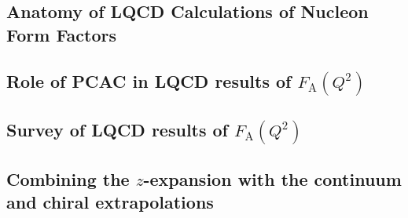 



%

\subsection{Anatomy of LQCD Calculations of Nucleon Form Factors\label{sec:calc_anatomy}}


\subsection{Role of PCAC in LQCD results of $F_{\mathrm{A}}(Q^2)$\label{sec:lqcd_pcac}}


\subsection{Survey of LQCD results of $F_{\mathrm{A}}(Q^2)$\label{sec:lqcd_results}}


\subsection{Combining the $z$-expansion with the continuum and chiral extrapolations\label{sec:z_continuum}}

